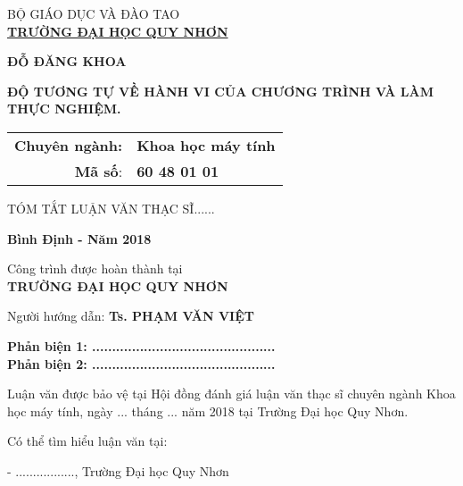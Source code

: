 
\begin{center} 
	
BỘ GIÁO DỤC VÀ ĐÀO TAO \\ \textbf{ \underline{TRƯỜNG ĐẠI HỌC QUY NHƠN} } 

		
\vspace{4cm}


\textbf{ĐỖ ĐĂNG KHOA}

\vspace{4cm}



\textbf{ĐỘ TƯƠNG TỰ VỀ HÀNH VI CỦA CHƯƠNG TRÌNH 
VÀ LÀM THỰC NGHIỆM.}

\vspace{2cm}


\begin{tabular}{rl}	
	\textbf{Chuyên ngành:} & \textbf{Khoa học máy tính} \\ 
	\textbf{Mã số}: & \textbf{60 48 01 01} \\ 
\end{tabular} 


\vspace{3cm}
TÓM TẮT LUẬN VĂN THẠC SĨ......




\vspace{2cm}
\textbf{Bình Định - Năm 2018}

\end{center}
	

\break

\begin{center}
	Công trình được hoàn thành tại \\
	\textbf{TRƯỜNG ĐẠI HỌC QUY NHƠN}
\end{center}

\vspace{2cm}

\begin{center}
	Người hướng dẫn: \textbf{Ts. PHẠM VĂN VIỆT}
	
\end{center}

\vspace{2cm}

\begin{center}
\textbf{Phản biện 1: ..............................................\\
Phản biện 2: ..............................................}
	
\end{center}

\vspace{4cm}

Luận văn được bảo vệ tại Hội đồng đánh giá luận văn thạc sĩ chuyên ngành Khoa học máy tính, ngày ... tháng ... năm 2018 tại Trường Đại học Quy Nhơn.

\vspace{4cm}

Có thể tìm hiểu luận văn tại:

- ................., Trường Đại học Quy Nhơn